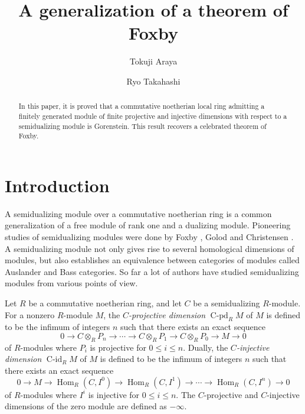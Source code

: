 \documentclass[a4, 10pt]{amsart}
\theoremstyle{plain}
\theoremstyle{definition}
\theoremstyle{remark}
\def\Hom{\operatorname{Hom}}
\def\cpd{\operatorname{\text{$C$}-pd}}
\def\cid{\operatorname{\text{$C$}-id}}
\begin{document}

\title{A generalization of a theorem of Foxby}
\author{Tokuji Araya}
\address{Nara University of Education, Takabatake-cho, Nara 630-8528, Japan}
\author{Ryo Takahashi}
\address{Department of Mathematical Sciences, Faculty of Science, Shinshu University, 3-1-1 Asahi, Matsumoto, Nagano 390-8621, Japan}
\begin{abstract}
In this paper, it is proved that a commutative noetherian local ring admitting a finitely generated module of finite projective and injective dimensions with respect to a semidualizing module is Gorenstein.
This result recovers a celebrated theorem of Foxby.
\end{abstract}
\maketitle
\section{Introduction}

A semidualizing module over a commutative noetherian ring is a common generalization of a free module of rank one and a dualizing module.
Pioneering studies of semidualizing modules were done by Foxby \cite{F0}, Golod \cite{Go} and Christensen \cite{Cp}.
A semidualizing module not only gives rise to several homological dimensions of modules, but also establishes an equivalence between categories of modules called Auslander and Bass categories.
So far a lot of authors have studied semidualizing modules from various points of view.

Let $R$ be a commutative noetherian ring, and let $C$ be a semidualizing $R$-module.
For a nonzero $R$-module $M$, the {\em $C$-projective dimension} $\cpd_RM$ of $M$ is defined to be the infimum of integers $n$ such that there exists an exact sequence 
$$
0 \to C\otimes_RP_n \to \cdots \to C\otimes_RP_1 \to C\otimes_RP_0 \to M \to 0
$$
of $R$-modules where $P_i$ is projective for $0\le i\le n$.
Dually, the {\em $C$-injective dimension} $\cid_RM$ of $M$ is defined to be the infimum of integers $n$ such that there exists an exact sequence 
$$
0 \to M \to \Hom_R(C,I^0) \to \Hom_R(C,I^1) \to \cdots \to \Hom_R(C,I^n) \to 0
$$
of $R$-modules where $I^i$ is injective for $0\le i\le n$.
The $C$-projective and $C$-injective dimensions of the zero module are defined as $-\infty$.
\end{document}
